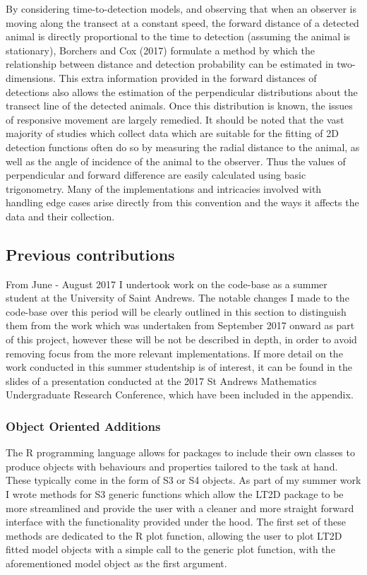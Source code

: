 \documentclass[11pt]{article}
\begin{document}
\begin{multicols}{2}
By considering time-to-detection models, and observing that when an observer is moving along the transect at a constant speed, the forward distance of a detected animal is directly proportional to the time to detection (assuming the animal is stationary), Borchers and Cox (2017) formulate a method by which the relationship between distance and detection probability can be estimated in two-dimensions. This extra information provided in the forward distances of detections also allows the estimation of the perpendicular distributions about the transect line of the detected animals. Once this distribution is known, the issues of responsive movement are largely remedied. It should be noted that the vast majority of studies which collect data which are suitable for the fitting of 2D detection functions often do so by measuring the radial distance to the animal, as well as the angle of incidence of the animal to the observer. Thus the values of perpendicular and forward difference are easily calculated using basic trigonometry. Many of the implementations and intricacies involved with handling edge cases arise directly from this convention and the ways it affects the data and their collection.

\subsection{Previous contributions}

From June - August 2017 I undertook work on the code-base as a summer student at the University of Saint Andrews. The notable changes I made to the code-base over this period will be clearly outlined in this section to distinguish them from the work which was undertaken from September 2017 onward as part of this project, however these will be not be described in depth, in order to avoid removing focus from the more relevant implementations. If more detail on the work conducted in this summer studentship is of interest, it can be found in the slides of a presentation conducted at the 2017 St Andrews Mathematics Undergraduate Research Conference, which have been included in the appendix. 

\subsubsection{Object Oriented Additions}
The R programming language allows for packages to include their own classes to produce objects with behaviours and properties tailored to the task at hand. These typically come in the form of S3 or S4 objects. As part of my summer work I wrote methods for S3 generic functions which allow the LT2D package to be more streamlined and provide the user with a cleaner and more straight forward interface with the functionality provided under the hood. The first set of these methods are dedicated to the R plot function, allowing the user to plot LT2D fitted model objects with a simple call to the generic plot function, with the aforementioned model object as the first argument. 


\end{multicols}
\end{document}

